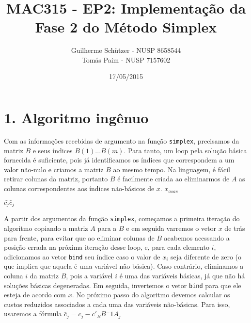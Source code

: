 \documentclass[a4paper]{article}
\title{MAC315 - EP2: Implementação da Fase 2 do Método Simplex}
\author{
	Guilherme Schützer - NUSP 8658544 \\
	Tomás Paim         - NUSP 7157602
}
\date{17/05/2015}
\begin{document}
\maketitle

\section{1. Algoritmo ingênuo}
Com as informações recebidas de argumento na função \texttt{simplex}, precisamos da matriz $B$ e seus índices $B(1)...B(m)$. Para tanto, um loop pela solução básica fornecida é suficiente, pois já identificamos os índices que correspondem a um valor não-nulo e criamos a matriz $B$ ao mesmo tempo. Na linguagem, é fácil retirar colunas da matriz, portanto $B$ é facilmente criada ao eliminarmos de $A$ as colunas correspondentes aos índices não-básicos de $x$. $x_{asas}$

$\bar{c_{j}} \bar{c}_{j}$

A partir dos argumentos da função \texttt{simplex}, começamos a primeira iteração do algoritmo copiando a matriz $A$ para a $B$ e em seguida varremos o vetor $x$ de trás para frente, para evitar que ao eliminar colunas de $B$ acabemos acessando a posição errada na próxima iteração desse loop, e, para cada elemento $i$, adicionamos ao vetor \texttt{bind} seu índice caso o valor de $x_{i}$ seja diferente de zero (o que implica que aquela é uma variável não-básica). Caso contrário, eliminamos a coluna $i$ da matriz $B$, pois a variável $i$ é uma das variáveis básicas, já que não há soluções básicas degeneradas. Em seguida, invertemos o vetor \texttt{bind} para que ele esteja de acordo com $x$.
No próximo passo do algoritmo devemos calcular os custos reduzidos associados a cada uma das variáveis não-básicas. Para isso, usaremos a fórmula \begin{math}\bar{c}_{j} = c_{j} - c'_{B}B^-1A_{j}\end{math}
\end{document}

